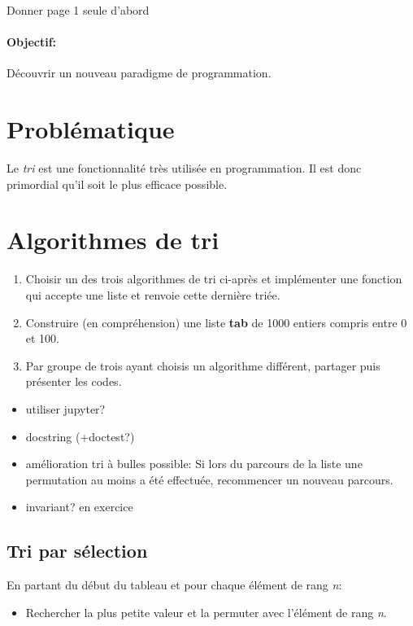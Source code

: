 \documentclass[a4paper,11pt]{article}
\begin{document}
\begin{Form}
\begin{commentprof}
Donner page 1 seule d'abord
\end{commentprof}
\paragraph{Objectif:}Découvrir un nouveau paradigme de programmation.
\section{Problématique}
Le \emph{tri} est une fonctionnalité très utilisée en programmation. Il est donc primordial qu'il soit le plus efficace possible.
\begin{center}
\end{center}
\section{Algorithmes de tri}
\begin{activite}
\begin{enumerate}
\item Choisir un des trois algorithmes de tri ci-après et implémenter une fonction qui accepte une liste et renvoie cette dernière triée.
\item Construire (en compréhension) une liste \textbf{tab} de 1000 entiers compris entre 0 et 100.
\item Par groupe de trois ayant choisis un algorithme différent, partager puis présenter les codes.
\end{enumerate}
\end{activite}
\begin{commentprof}
\begin{itemize}
\item utiliser jupyter?
\item docstring (+doctest?)
\item amélioration tri à bulles possible: Si lors du parcours de la liste une permutation au moins a été effectuée, recommencer un nouveau parcours.
\item invariant? en exercice
\end{itemize}
\end{commentprof}
\subsection{Tri par sélection}
En partant du début du tableau et pour chaque élément de rang \emph{n}:
\begin{itemize}
\item Rechercher la plus petite valeur et la permuter avec l'élément de rang \emph{n}.
\end{itemize}

\end{Form}
\end{document}
